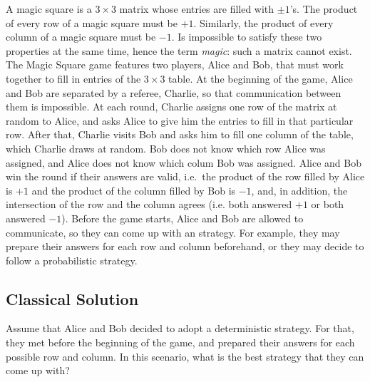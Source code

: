 \documentclass{llncs}
\begin{document}
A magic square is a \(3 \times 3\) matrix whose entries are filled
with \(\pm 1\)'s. The product of every row of a magic square must be
\(+1\). Similarly, the product of every column of a magic square must
be \(-1\). Is impossible to satisfy these two properties at the same
time, hence the term \emph{magic}: such a matrix cannot exist. The
Magic Square game features two players, Alice and Bob, that must work
together to fill in entries of the \(3 \times 3\) table.  At the
beginning of the game, Alice and Bob are separated by a referee,
Charlie, so that communication between them is impossible. At each
round, Charlie assigns one row of the matrix at random to Alice, and
asks Alice to give him the entries to fill in that particular
row. After that, Charlie visits Bob and asks him to fill one column of
the table, which Charlie draws at random.  Bob does not know which row
Alice was assigned, and Alice does not know which colum Bob was
assigned. Alice and Bob win the round if their answers are valid,
i.e.\ the product of the row filled by Alice is \(+1\) and the product
of the column filled by Bob is \(-1\), and, in addition, the
intersection of the row and the column agrees (i.e. both answered
\(+1\) or both answered \(-1\)). Before the game starts, Alice and Bob
are allowed to communicate, so they can come up with an strategy.  For
example, they may prepare their answers for each row and column
beforehand, or they may decide to follow a probabilistic strategy.

\subsection{Classical Solution}
\label{sec:classic-sol}
Assume that Alice and Bob decided to adopt a deterministic strategy.
For that, they met before the beginning of the game, and prepared
their answers for each possible row and column. In this scenario,
what is the best strategy that they can come up with?
\end{document}
